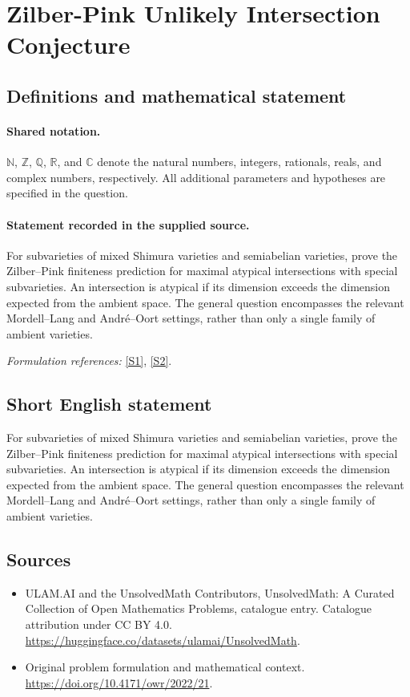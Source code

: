 \documentclass[11pt]{article}
\newcommand{\sref}[2]{\hyperlink{source:#1:#2}{[S#2]}}
\begin{document}
\section{Zilber-Pink Unlikely Intersection Conjecture}\label{statement}

\subsection{Definitions and mathematical statement}

\paragraph{Shared notation.}$\mathbb N$, $\mathbb Z$, $\mathbb Q$, $\mathbb R$, and $\mathbb C$ denote the natural numbers, integers, rationals, reals, and complex numbers, respectively. All additional parameters and hypotheses are specified in the question.


\paragraph{Statement recorded in the supplied source.}
For subvarieties of mixed Shimura varieties and semiabelian varieties, prove the Zilber--Pink finiteness prediction for maximal atypical intersections with special subvarieties. An intersection is atypical if its dimension exceeds the dimension expected from the ambient space. The general question encompasses the relevant Mordell--Lang and Andr\'e--Oort settings, rather than only a single family of ambient varieties.
\par\smallskip\textit{Formulation references:} \sref{statement}{1}, \sref{statement}{2}.
\subsection{Short English statement}
For subvarieties of mixed Shimura varieties and semiabelian varieties, prove the Zilber--Pink finiteness prediction for maximal atypical intersections with special subvarieties. An intersection is atypical if its dimension exceeds the dimension expected from the ambient space. The general question encompasses the relevant Mordell--Lang and Andr\'e--Oort settings, rather than only a single family of ambient varieties.
\subsection{Sources}
\begin{itemize}
\item[\hypertarget{source:statement:1}{S1}] ULAM.AI and the UnsolvedMath Contributors, UnsolvedMath: A Curated Collection of Open Mathematics Problems, catalogue entry. Catalogue attribution under CC BY 4.0.
\url{https://huggingface.co/datasets/ulamai/UnsolvedMath}.
\item[\hypertarget{source:statement:2}{S2}] Original problem formulation and mathematical context.
\url{https://doi.org/10.4171/owr/2022/21}.
\end{itemize}
\label{end:statement}
\end{document}

